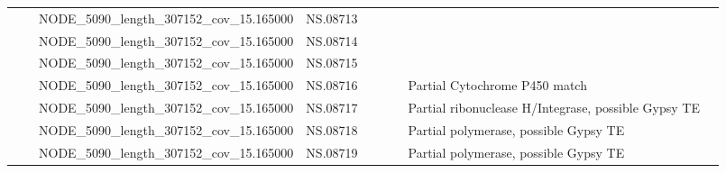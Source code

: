 \begin{longtable}{lllllllll}
                &           &   NODE\_5090\_length\_307152\_cov\_15.165000 &              NS.08713 &              &                 &                                                                                 &                                                                                 &                                                                                 \\
                &           &   NODE\_5090\_length\_307152\_cov\_15.165000 &              NS.08714 &              &                 &                                                                                 &                                                                                 &                                                                                 \\
                &           &   NODE\_5090\_length\_307152\_cov\_15.165000 &              NS.08715 &              &                 &                                                                                 &                                                                                 &                                                                                 \\
                &           &   NODE\_5090\_length\_307152\_cov\_15.165000 &              NS.08716 &              &                 &                                                                                 &                                                   Partial Cytochrome P450 match &                                                                                 \\
                &           &   NODE\_5090\_length\_307152\_cov\_15.165000 &              NS.08717 &              &                 &                                                                                 &                             Partial ribonuclease H/Integrase, possible Gypsy TE &                                                                                 \\
                &           &   NODE\_5090\_length\_307152\_cov\_15.165000 &              NS.08718 &              &                 &                                                                                 &                                           Partial polymerase, possible Gypsy TE &                                                                                 \\
                &           &   NODE\_5090\_length\_307152\_cov\_15.165000 &              NS.08719 &              &                 &                                                                                 &                                           Partial polymerase, possible Gypsy TE &                                                                                 \\

\end{longtable}
